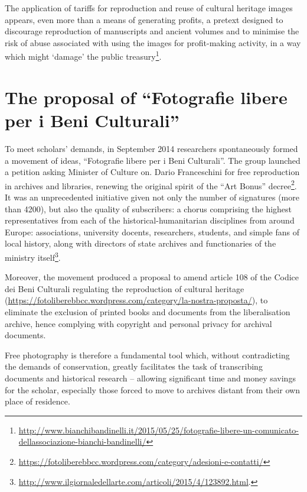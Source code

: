 \documentclass[amsthm,ebook]{saparticle}
\begin{document}
The application of tariffs for reproduction and reuse of cultural heritage images appears, even more than a means of
generating profits, a pretext designed to discourage reproduction of manuscripts and ancient volumes and to minimise
the risk of abuse associated with using the images for profit-making activity, in a way which might `damage' the public
treasury\footnote{\url{http://www.bianchibandinelli.it/2015/05/25/fotografie-libere-un-comunicato-dellassociazione-bianchi-bandinelli/}}.




\section{The proposal of ``Fotografie libere per i Beni Culturali''}




To meet scholars’ demands, in September 2014 researchers spontaneously formed a movement of ideas, ``Fotografie libere
per i Beni Culturali''. The group launched a petition asking Minister of Culture on. Dario Franceschini for free
reproduction in archives and libraries, renewing the original spirit of the ``Art Bonus''
decree\footnote{\url{https://fotoliberebbcc.wordpress.com/category/adesioni-e-contatti/}}. It was an unprecedented
initiative given not only the number of signatures (more than 4200), but also the quality of subscribers: a chorus
comprising the highest representatives from each of the historical-humanitarian disciplines from around Europe:
associations, university docents, researchers, students, and simple fans of local history, along with directors of
state archives and functionaries of the ministry
itself\footnote{\url{http://www.ilgiornaledellarte.com/articoli/2015/4/123892.html}.}.

Moreover, the movement produced a proposal to amend article 108 of the Codice dei Beni Culturali regulating the
reproduction of cultural heritage (\url{https://fotoliberebbcc.wordpress.com/category/la-nostra-proposta/}), to eliminate the
exclusion of printed books and documents from the liberalisation archive, hence complying with copyright and personal
privacy for archival documents.

Free photography is therefore a fundamental tool which, without contradicting the demands of conservation, greatly
facilitates the task of transcribing documents and historical research – allowing significant time and money savings
for the scholar, especially those forced to move to archives distant from their own place of residence.
\end{document}
